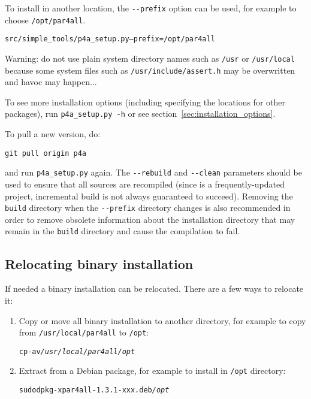 \documentclass[a4paper]{article}
\begin{document}
To install in another location, the \verb|--prefix| option can be used,
for example to choose \texttt{/opt/par4all}.

\begin{alltt}
src/simple_tools/p4a_setup.py --prefix=/opt/par4all
\end{alltt}

Warning: do not use plain
system directory names such as \texttt{/usr} or \texttt{/usr/local}
because some system files such as \texttt{/usr/include/assert.h} may be
overwritten and havoc may happen...

To see more installation options (including specifying the locations for
other packages), run \verb|p4a_setup.py -h| or see
section~\ref{sec:installation_options}.

To pull a new version, do:
\begin{verbatim}
git pull origin p4a
\end{verbatim}

and run \verb|p4a_setup.py| again. The
\verb|--rebuild| and \verb|--clean| parameters should be used to
ensure that all sources are recompiled
(since \Apips is a frequently-updated project, incremental build is
not always guaranteed to succeed). Removing the \texttt{build}
directory
when the \verb|--prefix| directory changes is also recommended
in order to remove obsolete
information about the installation directory that may remain in
the \texttt{build} directory and cause the compilation to fail.


\subsection{Relocating binary installation}
\label{sec:relocation}
If needed a \Apfa binary installation can be relocated. There are a few ways to relocate it:

\begin{enumerate}
\item Copy or move all \Apfa binary installation to another directory, for
  example to copy from \texttt{/usr/local/par4all} to \texttt{/opt}:
\begin{alltt}
cp -av \emph{/usr/local/par4all} \emph{/opt}
\end{alltt}

\item Extract from a Debian package, for example to install
  \Apfa in \texttt{/opt} directory:
\begin{alltt}
sudo dpkg -x par4all-1.3.1-xxx.deb \emph{/opt}
\end{alltt}

\end{enumerate}
\end{document}
